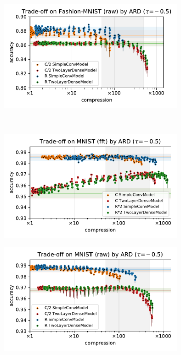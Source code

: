\documentclass[a4paper,10pt,onecolumn]{article}
\begin{document}
\begin{figure}[b]
\begin{subfigure}[b]{0.5\columnwidth}
  \end{subfigure}%
  \begin{subfigure}[b]{0.5\columnwidth}
    \centering
    \includegraphics[width=\columnwidth]{figure__mnist-like__trade-off/appendix__cmp__ARD__fashionmnist__raw__-0.5.pdf}
  \end{subfigure} \\ %
  \begin{subfigure}[b]{0.5\columnwidth}
    \centering
    \includegraphics[width=\columnwidth]{figure__mnist-like__trade-off/appendix__cmp__ARD__mnist__fft__-0.5.pdf}
  \end{subfigure}%
  \begin{subfigure}[b]{0.5\columnwidth}
    \centering
    \includegraphics[width=\columnwidth]{figure__mnist-like__trade-off/appendix__cmp__ARD__mnist__raw__-0.5.pdf}

\end{subfigure}
\end{figure}
\end{document}
